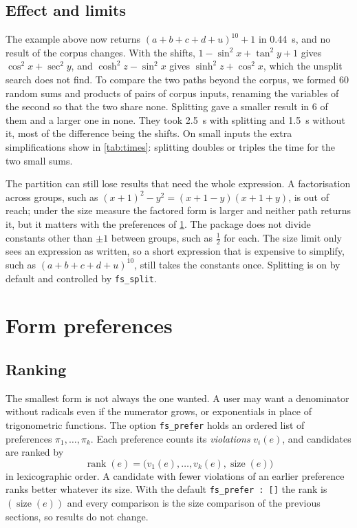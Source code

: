\documentclass[11pt]{amsart}
\newcommand{\mx}{\lstinline[style=mx]}
\theoremstyle{definition}
\theoremstyle{remark}
\DeclareMathOperator{\size}{size}
\DeclareMathOperator{\rank}{rank}
\begin{document}
\subsection{Effect and limits}

The example above now returns $(a+b+c+d+u)^{10} + 1$ in 0.44~s, and no
result of the corpus changes. With the shifts, $1 - \sin^2 x + \tan^2 y +
1$ gives $\cos^2 x + \sec^2 y$, and $\cosh^2 z - \sin^2 x$ gives $\sinh^2 z
+ \cos^2 x$, which the unsplit search does not find. To compare the two
paths beyond the corpus, we formed 60 random sums and products of pairs of
corpus inputs, renaming the variables of the second so that the two share
none. Splitting gave a smaller result in 6 of them and a larger one in none.
They took 2.5~s with splitting and 1.5~s without it, most of the difference
being the shifts. On small inputs the extra simplifications show in
\cref{tab:times}: splitting doubles or triples the time for the two small
sums.

The partition can still lose results that need the whole expression. A
factorisation across groups, such as $(x+1)^2 - y^2 = (x+1-y)(x+1+y)$, is
out of reach; under the size measure the factored form is larger and
neither path returns it, but it matters with the preferences of
\cref{sec:prefer}. The package does not divide constants other than $\pm 1$
between groups, such as $\tfrac12$ for each. The size
limit only sees an expression as written, so a short expression that is
expensive to simplify, such as $(a+b+c+d+u)^{10}$, still takes the
constants once. Splitting is on by default and controlled by
\mx|fs_split|.

\section{Form preferences}\label{sec:prefer}

\subsection{Ranking}

The smallest form is not always the one wanted. A user may want a
denominator without radicals even if the numerator grows, or exponentials in
place of trigonometric functions. The option
\mx|fs_prefer| holds an ordered list of preferences $\pi_1,\dots,\pi_k$.
Each preference counts its \emph{violations} $v_i(e)$, and candidates are
ranked by
\[
  \rank(e) = \bigl(v_1(e), \dots, v_k(e), \size(e)\bigr)
\]
in lexicographic order. A candidate with fewer violations of an earlier
preference ranks better whatever its size. With the default
\mx|fs_prefer : []| the rank is $(\size(e))$ and every comparison is the
size comparison of the previous sections, so results do not change.
\end{document}
